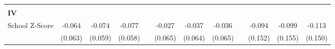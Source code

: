 \begin{table}[htpb!]
\begin{center}
{\begin{tabular}{lcccp{2mm}cccp{2mm}ccc}
\begin{footnotesize}\end{footnotesize}&\begin{footnotesize}\end{footnotesize}&\begin{footnotesize}\end{footnotesize}&\begin{footnotesize}\end{footnotesize}&\begin{footnotesize}\end{footnotesize}&\begin{footnotesize}\end{footnotesize}&\begin{footnotesize}\end{footnotesize}&\begin{footnotesize}\end{footnotesize}&\begin{footnotesize}\end{footnotesize}&\begin{footnotesize}\end{footnotesize}&\begin{footnotesize}\end{footnotesize}&\begin{footnotesize}\end{footnotesize}\\
\multicolumn{12}{l}{\textbf{IV}}\\ 
School Z-Score&-0.064&-0.074&-0.077&&-0.027&-0.037&-0.036&&-0.094&-0.099&-0.113\\
&(0.063)&(0.059)&(0.058)&&(0.065)&(0.064)&(0.065)&&(0.152)&(0.155)&(0.150)\\


\end{tabular}}
\end{center}
\end{table}
